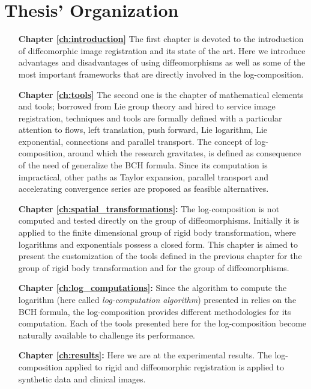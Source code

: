 \section*{Thesis' Organization}
\begin{enumerate}
	\item[{\bf Chapter \ref{ch:introduction}}] The first chapter is devoted to the introduction of diffeomorphic image registration and its state of the art. Here we introduce advantages and disadvantages of using diffeomorphisms as well as some of the most important frameworks that are directly involved in the log-composition.
	
	\item[{\bf Chapter \ref{ch:tools}}] The second one is the chapter of mathematical elements and tools; borrowed from Lie group theory and hired to service image registration, techniques and tools are formally defined with a particular attention to flows, left translation, push forward, Lie logarithm, Lie exponential, connections and parallel transport. The concept of log-composition, around which the research gravitates, is defined as consequence of the need of generalize the BCH formula. Since its computation is impractical, other paths as Taylor expansion, parallel transport and accelerating convergence series are proposed as feasible alternatives. 
	
	\item[{\bf Chapter \ref{ch:spatial_transformations}:}] The log-composition is not computed and tested directly on the group of diffeomorphisms. Initially it is applied to the finite dimensional group of rigid body transformation, where logarithms and exponentials possess a closed form. This chapter is aimed to present the customization of the tools defined in the previous chapter for the group of rigid body transformation and for the group of diffeomorphisms.
	
	\item[{\bf Chapter \ref{ch:log_computations}:}] Since the algorithm to compute the logarithm (here called \emph{log-computation algorithm}) presented in \cite{Bossa2007} relies on the BCH formula, the log-composition provides different methodologies for its computation. Each of the tools presented here for the log-composition become naturally available to challenge its performance.
  
	\item[{\bf Chapter \ref{ch:results}:}] Here we are at the experimental results. The log-composition applied to rigid and diffeomorphic registration is applied to synthetic data and clinical images. \\
	
	
\end{enumerate}









